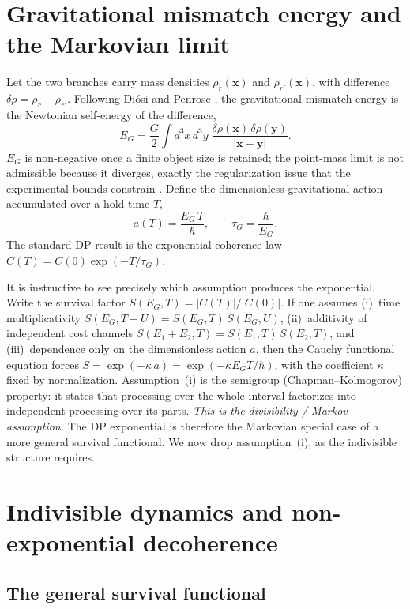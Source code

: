 \documentclass[aps,pra,preprint,amsmath,amssymb,nofootinbib,superscriptaddress]{revtex4-2}
\begin{document}
\section{Gravitational mismatch energy and the Markovian limit}
\label{sec:markov}

Let the two branches carry mass densities $\rho_r(\bm{x})$ and
$\rho_{r'}(\bm{x})$, with difference $\delta\rho=\rho_r-\rho_{r'}$. Following
Di\'osi and Penrose \cite{penrose1996,diosi1989,diosi1987}, the gravitational
mismatch energy is the Newtonian self-energy of the difference,
\begin{equation}
E_G=\frac{G}{2}\int d^3x\,d^3y\;
\frac{\delta\rho(\bm{x})\,\delta\rho(\bm{y})}{|\bm{x}-\bm{y}|}.
\end{equation}
$E_G$ is non-negative once a finite object size is retained; the point-mass limit
is not admissible because it diverges, exactly the regularization issue that the
experimental bounds constrain \cite{donadi2021}. Define the dimensionless
gravitational action accumulated over a hold time $T$,
\begin{equation}
a(T)=\frac{E_G\,T}{\hbar},\qquad \tau_G=\frac{\hbar}{E_G}.
\end{equation}
The standard DP result is the exponential coherence law
$C(T)=C(0)\exp(-T/\tau_G)$.

It is instructive to see precisely which assumption produces the exponential.
Write the survival factor $S(E_G,T)=|C(T)|/|C(0)|$. If one assumes (i)~time
multiplicativity $S(E_G,T+U)=S(E_G,T)\,S(E_G,U)$, (ii)~additivity of independent
cost channels $S(E_1+E_2,T)=S(E_1,T)\,S(E_2,T)$, and (iii)~dependence only on the
dimensionless action $a$, then the Cauchy functional equation forces
$S=\exp(-\kappa\,a)=\exp(-\kappa E_G T/\hbar)$, with the coefficient $\kappa$
fixed by normalization. Assumption~(i) is the semigroup (Chapman--Kolmogorov)
property: it states that processing over the whole interval factorizes into
independent processing over its parts. \emph{This is the divisibility / Markov
assumption.} The DP exponential is therefore the Markovian special case of a more
general survival functional. We now drop assumption~(i), as the indivisible
structure requires.

\section{Indivisible dynamics and non-exponential decoherence}

\subsection{The general survival functional}
\end{document}
